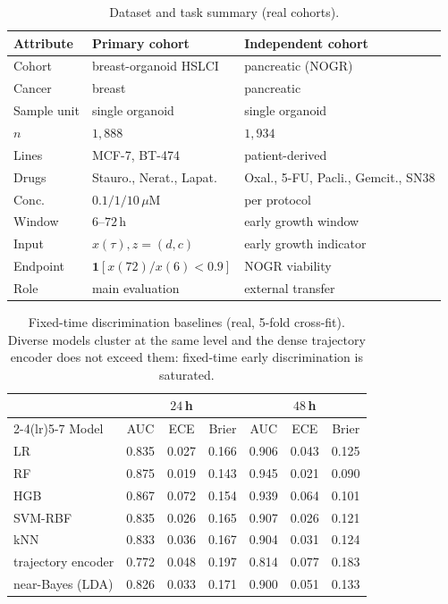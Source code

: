 \begin{table}[t]\centering\small\caption{Dataset and task summary (real cohorts).}\label{tab:data}
\begin{tabular}{@{}lll@{}}\toprule
Attribute & Primary cohort & Independent cohort\\\midrule
Cohort & breast-organoid HSLCI & pancreatic (NOGR)\\
Cancer & breast & pancreatic\\
Sample unit & single organoid & single organoid\\
$n$ & $1{,}888$ & $1{,}934$\\
Lines & MCF-7, BT-474 & patient-derived\\
Drugs & Stauro., Nerat., Lapat. & Oxal., 5-FU, Pacli., Gemcit., SN38\\
Conc. & $0.1/1/10\,\mu$M & per protocol\\
Window & $6$--$72$\,h & early growth window\\
Input & $x(\tau),z{=}(d,c)$ & early growth indicator\\
Endpoint & $\mathbf 1[x(72)/x(6){<}0.9]$ & NOGR viability\\
Role & main evaluation & external transfer\\\bottomrule
\end{tabular}\end{table}

\begin{table}[t]\centering\small\caption{Fixed-time discrimination baselines (real, 5-fold cross-fit). Diverse models cluster at the same level and the dense trajectory encoder does not exceed them: fixed-time early discrimination is saturated.}\label{tab:baselines}
\begin{tabular}{@{}lcccccc@{}}\toprule
& \multicolumn{3}{c}{$24$\,h} & \multicolumn{3}{c}{$48$\,h}\\ \cmidrule(lr){2-4}\cmidrule(lr){5-7}
Model & AUC & ECE & Brier & AUC & ECE & Brier\\\midrule
LR & 0.835 & 0.027 & 0.166 & 0.906 & 0.043 & 0.125\\
RF & 0.875 & 0.019 & 0.143 & 0.945 & 0.021 & 0.090\\
HGB & 0.867 & 0.072 & 0.154 & 0.939 & 0.064 & 0.101\\
SVM-RBF & 0.835 & 0.026 & 0.165 & 0.907 & 0.026 & 0.121\\
kNN & 0.833 & 0.036 & 0.167 & 0.904 & 0.031 & 0.124\\
trajectory encoder & 0.772 & 0.048 & 0.197 & 0.814 & 0.077 & 0.183\\
near-Bayes (LDA) & 0.826 & 0.033 & 0.171 & 0.900 & 0.051 & 0.133\\
\bottomrule\end{tabular}\end{table}

